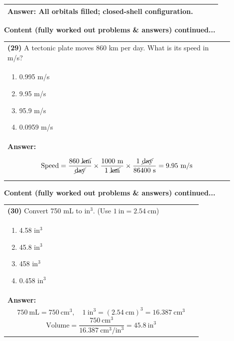 \documentclass{article}
\begin{document}
\begin{tabular}{|p{0.9\linewidth}|}
\textbf{Answer:} All orbitals filled; closed-shell configuration.
\vspace{0.2cm}
\\
\hline
\end{tabular}

\newpage
\noindent
{\large\textbf{Content (fully worked out problems \& answers) continued...}}\\[0.2em]
\vspace{0.2cm}
\begin{tabular}{|p{0.9\linewidth}|}
\hline
\vspace{0.2cm}
\textbf{(29)} A tectonic plate moves 860 km per day. What is its speed in m/s?\\
\begin{minipage}[t]{0.85\linewidth}
\begin{enumerate}[label=\alph*.]
   \item 0.995 m/s \
   \item 9.95 m/s \
   \item 95.9 m/s \
   \item 0.0959 m/s
\end{enumerate}
\end{minipage}\\
\hline
\vspace{0.2cm}
\textbf{Answer:}\\
\[
\text{Speed}=\frac{860~\cancel{\text{km}}}{\cancel{\text{day}}}\times\frac{1000~\text{m}}{1~\cancel{\text{km}}}\times\frac{1~\cancel{\text{day}}}{86400~\text{s}}=9.95~\text{m/s}
\] \\
\hline
\end{tabular}

\newpage
\noindent
{\large\textbf{Content (fully worked out problems \& answers) continued...}}\\[0.2em]
\vspace{0.2cm}
\begin{tabular}{|p{0.9\linewidth}|}
\hline
\vspace{0.2cm}
\textbf{(30)} Convert 750 mL to $\text{in}^3$. (Use $1~\text{in}=2.54~\text{cm}$)\\
\begin{minipage}[t]{0.85\linewidth}
\begin{enumerate}[label=\alph*.]
   \item 4.58 $\text{in}^3$ \
   \item 45.8 $\text{in}^3$ \
   \item 458 $\text{in}^3$ \
   \item 0.458 $\text{in}^3$
\end{enumerate}
\end{minipage}\\
\hline
\vspace{0.2cm}
\textbf{Answer:}\\
\[
750~\text{mL}=750~\text{cm}^3,\quad 1~\text{in}^3=(2.54~\text{cm})^3=16.387~\text{cm}^3
\]
\[
\text{Volume}=\frac{750~\text{cm}^3}{16.387~\text{cm}^3/\text{in}^3}=45.8~\text{in}^3
\] \\
\hline
\end{tabular}
\end{document}

